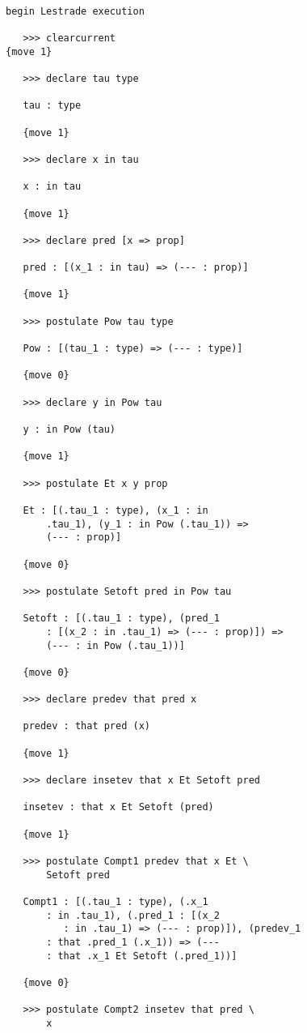 \documentclass[12pt]{article}
\begin{document}
\begin{verbatim}

begin Lestrade execution

   >>> clearcurrent
{move 1}

   >>> declare tau type

   tau : type

   {move 1}

   >>> declare x in tau

   x : in tau

   {move 1}

   >>> declare pred [x => prop]

   pred : [(x_1 : in tau) => (--- : prop)]

   {move 1}

   >>> postulate Pow tau type

   Pow : [(tau_1 : type) => (--- : type)]

   {move 0}

   >>> declare y in Pow tau

   y : in Pow (tau)

   {move 1}

   >>> postulate Et x y prop

   Et : [(.tau_1 : type), (x_1 : in 
       .tau_1), (y_1 : in Pow (.tau_1)) => 
       (--- : prop)]

   {move 0}

   >>> postulate Setoft pred in Pow tau

   Setoft : [(.tau_1 : type), (pred_1 
       : [(x_2 : in .tau_1) => (--- : prop)]) => 
       (--- : in Pow (.tau_1))]

   {move 0}

   >>> declare predev that pred x

   predev : that pred (x)

   {move 1}

   >>> declare insetev that x Et Setoft pred

   insetev : that x Et Setoft (pred)

   {move 1}

   >>> postulate Compt1 predev that x Et \
       Setoft pred

   Compt1 : [(.tau_1 : type), (.x_1 
       : in .tau_1), (.pred_1 : [(x_2 
          : in .tau_1) => (--- : prop)]), (predev_1 
       : that .pred_1 (.x_1)) => (--- 
       : that .x_1 Et Setoft (.pred_1))]

   {move 0}

   >>> postulate Compt2 insetev that pred \
       x


\end{verbatim}
\end{document}
